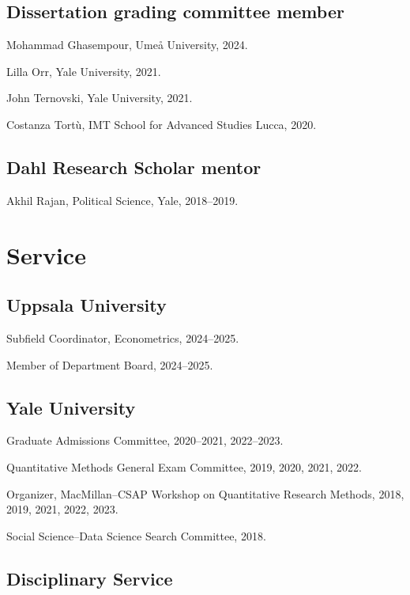 \documentclass[10pt,letterpaper]{article}
\newenvironment{infolist}{
	\begin{list}{}{
		\setlength{\parskip}{0pt}
		\setlength{\itemsep}{4pt}
		\setlength{\parsep}{0.3em}
		\setlength{\leftmargin}{0em}
		\setlength{\labelwidth}{0em}
		}
	}{
\end{list}
}
\newcommand{\infoitem}[1]{\item {#1}}
\begin{document}
	\subsection*{Dissertation grading committee member}

	\begin{infolist}
		\infoitem{Mohammad Ghasempour, Umeå University, 2024.}
		\infoitem{Lilla Orr, Yale University, 2021.}
		\infoitem{John Ternovski, Yale University, 2021.}
		\infoitem{Costanza Tortù, IMT School for Advanced Studies Lucca, 2020.}
	\end{infolist}

	\subsection*{Dahl Research Scholar mentor}

	\begin{infolist}
		\infoitem{Akhil Rajan, Political Science, Yale, 2018--2019.}
	\end{infolist}


	\section*{Service}

	\subsection*{Uppsala University}

	\begin{infolist}
		\infoitem{Subfield Coordinator, Econometrics, 2024--2025.}
		\infoitem{Member of Department Board, 2024--2025.}
	\end{infolist}

	\subsection*{Yale University}

	\begin{infolist}
		\infoitem{Graduate Admissions Committee, 2020--2021, 2022--2023.}
		\infoitem{Quantitative Methods General Exam Committee, 2019, 2020, 2021, 2022.}
		\infoitem{Organizer, MacMillan--CSAP Workshop on Quantitative Research Methods, 2018, 2019, 2021, 2022, 2023.}
		\infoitem{Social Science--Data Science Search Committee, 2018.}
	\end{infolist}

	\subsection*{Disciplinary Service}
\end{document}
